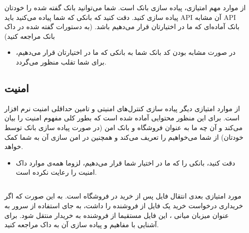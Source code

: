 \documentclass[]{article}
\begin{document}
از موارد مهم امتیازی، پیاده سازی بانک است. شما می‌توانید بانک گفته شده را خودتان پیاده سازی کنید. دقت کنید که بانکی که شما پیاده می‌کنید باید API آن مشابه API بانک آماده‌ای که ما در اختیارتان قرار می‌دهیم باشد. (‌به دستورات گفته شده در
\textcolor{CustomColor}{داک بانک}
  مراجعه کنید)
 


\begin{itemize}[label = $\star$]
\item

در صورت مشابه بودن کد بانک شما به بانکی که ما در اختیارتان قرار می‌دهیم،‌ برای شما \textcolor{CustomColor}{تقلب} منظور می‌گردد.


\end{itemize}



\subsection*{{\titr امنیت}}

از موارد امتیازی دیگر پیاده سازی کنترل‌های امنیتی و تامین حداقلی امنیت نرم افزار است. برای این منظور محتوایی آماده شده است که بطور کلی مفهوم امنیت را بیان می‌کند و آن چه ما به عنوان فروشگاه و بانک امن (در صورت پیاده سازی بانک توسط خودتان) از شما می‌خواهیم را تعریف می‌کند و همچنین در امن سازی آن به شما کمک خواهد.

\begin{itemize}[label = $\star$]
\item

دقت کنید، بانکی را که ما در اختیار شما قرار می‌دهیم، لزوما همه‌ی موارد \textcolor{CustomColor}{داک امنیت} را رعایت نکرده است.

\end{itemize}




\subsection*{{}}
\label{subsec:p2p}

مورد امتیازی بعدی انتقال  فایل پس از خرید در فروشگاه است. به این صورت که اگر خریداری درخواست خرید یک فایل از فروشنده را داشت،‌ به جای استفاده از سرور به عنوان میزبان میانی ، این فایل مستقیما از فروشنده به خریدار منتقل شود. برای آشنایی با مفاهیم  و پیاده سازی آن به \textcolor{CustomColor}{داک } مراجعه کنید.
\end{document}
